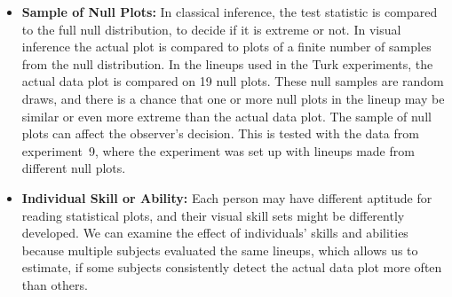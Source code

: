 \documentclass[10pt]{article}\usepackage[]{graphicx}\usepackage[]{xcolor}
\begin{document}
\begin{itemize}
\item{\bf Sample of Null Plots:} In classical inference, the test statistic is compared to the full null distribution, to decide if it is extreme or not. In visual inference the actual plot is compared to plots of a finite number of samples from the null distribution. In the lineups used in the Turk experiments, the actual data plot is compared on 19 null plots. These null samples are random draws, and there is a chance that one or more null plots in the lineup may be similar or even more extreme than the actual data plot. The sample of null plots can affect the observer's decision. This is tested with the data from experiment~9, where the experiment was set up with lineups made from different null plots.

\item{\bf Individual Skill or Ability:} Each person may have different  aptitude for reading statistical plots, and their visual skill sets might be differently developed.  We can examine the effect of individuals' skills and abilities because multiple subjects evaluated the same lineups, which allows us to estimate, if some subjects consistently detect the actual data plot more often than others.  
\end{itemize}
\end{document}
